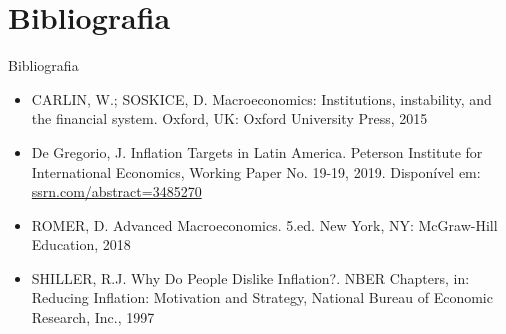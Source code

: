 \documentclass[10pt]{beamer}
\begin{document}
\section{Bibliografia}
\begin{frame}{ Bibliografia}
    \begin{itemize}                        
        \item CARLIN, W.; SOSKICE, D. Macroeconomics: Institutions, instability, and the financial system. Oxford, UK: Oxford University Press, 2015\medskip        
        \item De Gregorio, J. Inflation Targets in Latin America. Peterson Institute for International Economics, Working Paper No. 19-19, 2019. Disponível em: \href{https://papers.ssrn.com/sol3/papers.cfm?abstract_id=3485270}{ssrn.com/abstract=3485270}\medskip
        \item ROMER, D. Advanced Macroeconomics. 5.ed. New York, NY: McGraw-Hill Education, 2018\medskip
        \item SHILLER, R.J. Why Do People Dislike Inflation?. NBER Chapters, in: Reducing Inflation: Motivation and Strategy, National Bureau of Economic Research, Inc., 1997
    \end{itemize}
\end{frame}
\end{document}
